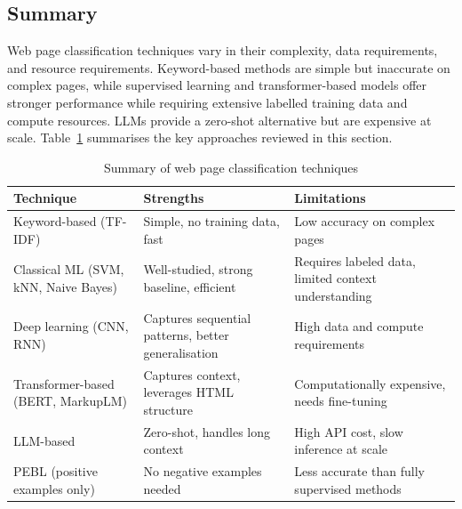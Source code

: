 \subsection{Summary}\label{subsec:webpage_classification_summary}

Web page classification techniques vary in their complexity, data requirements, and resource requirements.
Keyword-based methods are simple but inaccurate on complex pages, while supervised learning and transformer-based models offer stronger performance while requiring extensive labelled training data and compute resources.
LLMs provide a zero-shot alternative but are expensive at scale.
Table~\ref{tab:webpage_classification_summary} summarises the key approaches reviewed in this section.

\begin{table}[h]
    \centering
    \small
    \renewcommand{\arraystretch}{1.4}
    \begin{tabularx}{\textwidth}{p{4cm} X X}
        \toprule
        \textbf{Technique} & \textbf{Strengths} & \textbf{Limitations} \\
        \midrule
        Keyword-based (TF-IDF) & Simple, no training data, fast & Low accuracy on complex pages \\
        Classical ML (SVM, kNN, Naive Bayes) & Well-studied, strong baseline, efficient & Requires labeled data, limited context understanding \\
        Deep learning (CNN, RNN) & Captures sequential patterns, better generalisation & High data and compute requirements \\
        Transformer-based (BERT, MarkupLM) & Captures context, leverages HTML structure & Computationally expensive, needs fine-tuning \\
        LLM-based & Zero-shot, handles long context & High API cost, slow inference at scale \\
        PEBL (positive examples only) & No negative examples needed & Less accurate than fully supervised methods \\
        \bottomrule
    \end{tabularx}
    \caption{Summary of web page classification techniques}
    \label{tab:webpage_classification_summary}
\end{table}


